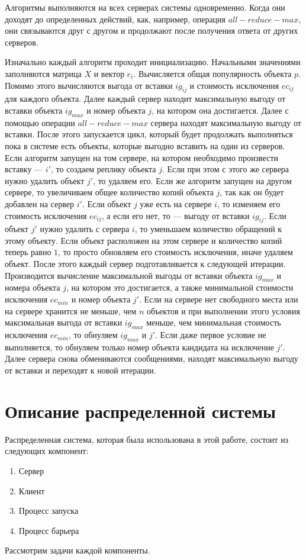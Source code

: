 			\newpage
			Алгоритмы выполняются на всех серверах системы одновременно. Когда они доходят до определенных действий, 
			как, например, операция $all-reduce-max$, они связываются друг с другом и продолжают после получения ответа 
			от других серверов.

			Изначально каждый алгоритм проходит инициализацию. Начальными значениями заполняются матрица $X$ и вектор $e_i$.
			Вычисляется общая популярность объекта $p$. Помимо этого вычисляются выгода от вставки $ig_{ij}$ и стоимость 
			исключения $ec_{ij}$ для каждого объекта. Далее каждый сервер находит максимальную выгоду от вставки объекта $ig_{max}$ и 
			номер объекта $j$, на котором она достигается. Далее с помощью операции $all-reduce-max$ сервера находят максимальную 
			выгоду от вставки. После этого запускается цикл, который будет продолжать выполняться пока в системе есть объекты, 
			которые выгодно вставить на один из серверов. Если алгоритм запущен на том сервере, на котором необходимо произвести 
			вставку --- $i'$, то создаем реплику объекта $j$. Если при этом с этого же сервера нужно удалить объект $j'$, то 
			удаляем его. Если же алгоритм запущен на другом сервере, то увеличиваем общее количество копий объекта $j$, так как он
			будет добавлен на сервер $i'$. Если объект $j$ уже есть на сервере $i$, то изменяем его стоимость исключения $ec_{ij}$,
			а если его нет, то --- выгоду от вставки $ig_{ij}$. Если объект $j'$ нужно удалить с сервера $i$, то уменьшаем количество 
			обращений к этому объекту. Если объект расположен на этом сервере и количество копий теперь равно $1$, то просто обновляем
			его стоимость исключения, иначе удаляем объект. После этого каждый сервер подготавливается к следующей итерации.
			Производится вычисление максимальной выгоды от вставки объекта $ig_{max}$ и номера объекта $j$, на котором это достигается, а также 
			минимальной стоимости исключения $ec_{min}$ и номер объекта $j'$. Если на сервере нет свободного места или на сервере хранится 
			не меньше, чем $n$ объектов и при выполнении этого условия максимальная выгода от вставки $ig_{max}$ меньше, чем минимальная стоимость 
			исключения $ec_{min}$, то обнуляем $ig_{max}$ и $j'$. Если даже первое условие не выполняется, то обнуляем только номер объекта 
			кандидата на исключение $j'$. Далее сервера снова обмениваются сообщениями, находят максимальную выгоду от вставки и
			переходят к новой итерации.
\newpage

\chapter{Описание распределенной системы}
	Распределенная система, которая была использована в этой работе, состоит из следующих компонент:
	\begin{enumerate}
		\item Сервер
		\item Клиент
		\item Процесс запуска
		\item Процесс барьера
	\end{enumerate}
	Рассмотрим задачи каждой компоненты.

